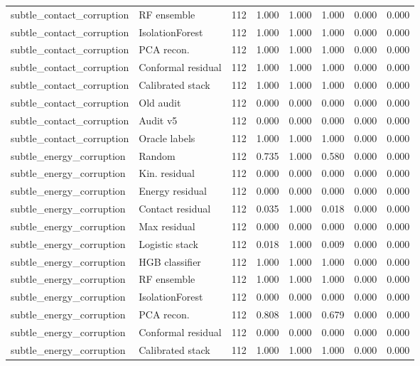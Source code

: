 {\begin{longtable}{llrrrrrr}
subtle\_contact\_corruption & RF ensemble & 112 & 1.000 & 1.000 & 1.000 & 0.000 & 0.000 \\
subtle\_contact\_corruption & IsolationForest & 112 & 1.000 & 1.000 & 1.000 & 0.000 & 0.000 \\
subtle\_contact\_corruption & PCA recon. & 112 & 1.000 & 1.000 & 1.000 & 0.000 & 0.000 \\
subtle\_contact\_corruption & Conformal residual & 112 & 1.000 & 1.000 & 1.000 & 0.000 & 0.000 \\
subtle\_contact\_corruption & Calibrated stack & 112 & 1.000 & 1.000 & 1.000 & 0.000 & 0.000 \\
subtle\_contact\_corruption & Old audit & 112 & 0.000 & 0.000 & 0.000 & 0.000 & 0.000 \\
subtle\_contact\_corruption & Audit v5 & 112 & 0.000 & 0.000 & 0.000 & 0.000 & 0.000 \\
subtle\_contact\_corruption & Oracle labels & 112 & 1.000 & 1.000 & 1.000 & 0.000 & 0.000 \\
subtle\_energy\_corruption & Random & 112 & 0.735 & 1.000 & 0.580 & 0.000 & 0.000 \\
subtle\_energy\_corruption & Kin. residual & 112 & 0.000 & 0.000 & 0.000 & 0.000 & 0.000 \\
subtle\_energy\_corruption & Energy residual & 112 & 0.000 & 0.000 & 0.000 & 0.000 & 0.000 \\
subtle\_energy\_corruption & Contact residual & 112 & 0.035 & 1.000 & 0.018 & 0.000 & 0.000 \\
subtle\_energy\_corruption & Max residual & 112 & 0.000 & 0.000 & 0.000 & 0.000 & 0.000 \\
subtle\_energy\_corruption & Logistic stack & 112 & 0.018 & 1.000 & 0.009 & 0.000 & 0.000 \\
subtle\_energy\_corruption & HGB classifier & 112 & 1.000 & 1.000 & 1.000 & 0.000 & 0.000 \\
subtle\_energy\_corruption & RF ensemble & 112 & 1.000 & 1.000 & 1.000 & 0.000 & 0.000 \\
subtle\_energy\_corruption & IsolationForest & 112 & 0.000 & 0.000 & 0.000 & 0.000 & 0.000 \\
subtle\_energy\_corruption & PCA recon. & 112 & 0.808 & 1.000 & 0.679 & 0.000 & 0.000 \\
subtle\_energy\_corruption & Conformal residual & 112 & 0.000 & 0.000 & 0.000 & 0.000 & 0.000 \\
subtle\_energy\_corruption & Calibrated stack & 112 & 1.000 & 1.000 & 1.000 & 0.000 & 0.000 \\

\end{longtable}}
